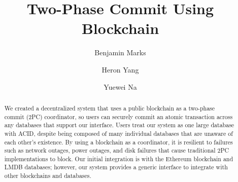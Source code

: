 \documentclass[11pt,sigplan,screen,nonacm]{acmart}
\begin{document}
\title{Two-Phase Commit Using Blockchain}

\author{Benjamin Marks}

\author{Heron Yang}

\author{Yuewei Na}


\begin{abstract}
  We created a decentralized system that uses a public blockchain as a two-phase commit (2PC) coordinator, so users can securely commit an atomic transaction across any databases that support our interface. Users treat our system as one large database with ACID, despite being composed of many individual databases that are unaware of each other’s existence. By using a blockchain as a coordinator, it is resilient to failures such as network outages, power outages, and disk failures that cause traditional 2PC implementations to block. Our initial integration is with the Ethereum blockchain and LMDB databases; however, our system provides a generic interface to integrate with other blockchains and databases.
\end{abstract}

\maketitle

\end{document}
